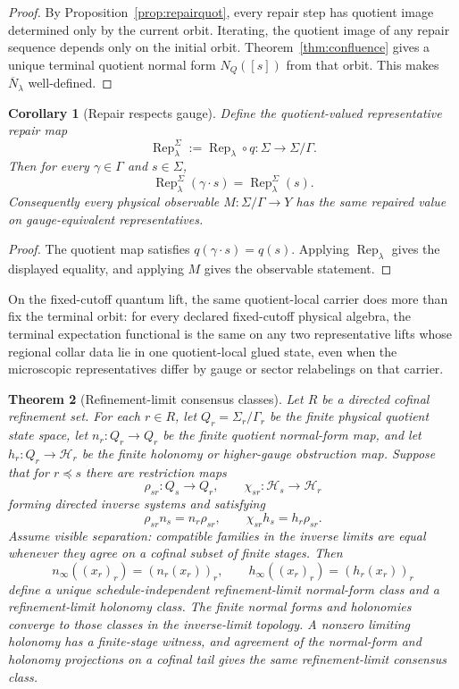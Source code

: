 \documentclass[11pt]{article}
\newtheorem{theorem}{Theorem}[section]
\newtheorem{corollary}[theorem]{Corollary}
\begin{document}
\begin{proof}
By Proposition~\ref{prop:repairquot}, every repair step has quotient image determined only by the
current orbit. Iterating, the quotient image of any repair sequence depends only on the initial
orbit. Theorem~\ref{thm:confluence} gives a unique terminal quotient normal form \(N_Q([s])\)
from that orbit. This makes \(\overline N_\lambda\) well-defined.
\end{proof}

\begin{corollary}[Repair respects gauge]\label{cor:repair-respects-gauge}
Define the quotient-valued representative repair map
\[
\operatorname{Rep}^{\Sigma}_\lambda
:=
\operatorname{Rep}_\lambda\circ q
:
\Sigma\to\Sigma/\Gamma.
\]
Then for every \(\gamma\in\Gamma\) and \(s\in\Sigma\),
\[
\operatorname{Rep}^{\Sigma}_\lambda(\gamma\cdot s)
=
\operatorname{Rep}^{\Sigma}_\lambda(s).
\]
Consequently every physical observable \(M:\Sigma/\Gamma\to Y\) has the same repaired value on
gauge-equivalent representatives.
\end{corollary}

\begin{proof}
The quotient map satisfies \(q(\gamma\cdot s)=q(s)\).  Applying \(\operatorname{Rep}_\lambda\)
gives the displayed equality, and applying \(M\) gives the observable statement.
\end{proof}

On the fixed-cutoff quantum lift, the same quotient-local carrier does more than fix the terminal
orbit: for every declared fixed-cutoff physical algebra, the terminal expectation functional is
the same on any two representative lifts whose regional collar data lie in one quotient-local
glued state, even when the microscopic representatives differ by gauge or sector relabelings on
that carrier.

\begin{theorem}[Refinement-limit consensus classes]\label{thm:consensusrefinement}
Let \(R\) be a directed cofinal refinement set. For each \(r\in R\), let
\(Q_r=\Sigma_r/\Gamma_r\) be the finite physical quotient state space, let
\(n_r:Q_r\to Q_r\) be the finite quotient normal-form map, and let
\(h_r:Q_r\to\mathcal H_r\) be the finite holonomy or higher-gauge obstruction map. Suppose that
for \(r\preceq s\) there are restriction maps
\[
\rho_{sr}:Q_s\to Q_r,\qquad \chi_{sr}:\mathcal H_s\to\mathcal H_r
\]
forming directed inverse systems and satisfying
\[
\rho_{sr}n_s=n_r\rho_{sr},
\qquad
\chi_{sr}h_s=h_r\rho_{sr}.
\]
Assume visible separation: compatible families in the inverse limits are equal whenever they
agree on a cofinal subset of finite stages. Then
\[
n_\infty((x_r)_r)=(n_r(x_r))_r,
\qquad
h_\infty((x_r)_r)=(h_r(x_r))_r
\]
define a unique schedule-independent refinement-limit normal-form class and a refinement-limit
holonomy class. The finite normal forms and holonomies converge to those classes in the
inverse-limit topology. A nonzero limiting holonomy has a finite-stage witness, and agreement of
the normal-form and holonomy projections on a cofinal tail gives the same refinement-limit
consensus class.
\end{theorem}
\end{document}
